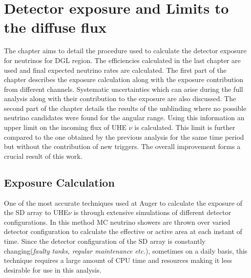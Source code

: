 
\chapter{Detector exposure and Limits to the diffuse flux}
\label{sec:align}
 
The chapter aims to detail the procedure used to calculate the detector exposure for neutrinos for DGL region. The efficiencies calculated in the last chapter are used and final expected neutrino rates are calculated. The first part of the chapter describes the exposure calculation along with the exposure contribution from different channels. Systematic uncertainties which can arise during the full analysis along with their contribution to the exposure are also discussed. 
The second part of the chapter details the results of the unblinding where no possible neutrino candidates were found for the angular range. Using this information an upper limit on the incoming flux of UHE $\nu$ is calculated. This limit is further compared to the one obtained by the previous analysis for the same time period but without the contribution of new triggers. The overall improvement forms a crucial result of this work. 


\section{Exposure Calculation}
\label{sec:det_exposure_calc}

One of the most accurate techniques used at Auger to calculate the exposure of the SD array to UHE$\nu$ is through extensive simulations of different detector configurations. In this method MC neutrino showers are thrown over varied detector configuration to calculate the effective or active area at each instant of time. Since the detector configuration of the SD array is constantly changing(\textit{faulty tanks, regular maintenance etc.}), sometimes on a daily basis, this technique requires a large amount of CPU time and resources making it less desirable for use in this analysis. 

